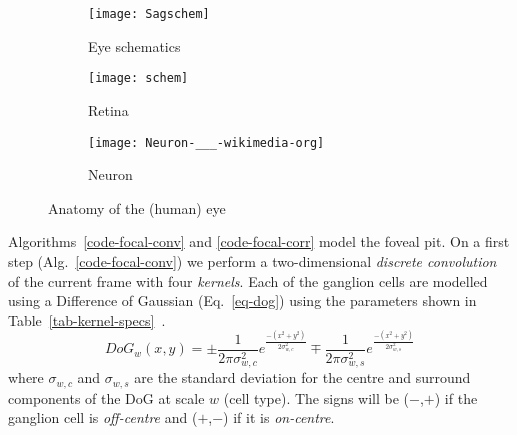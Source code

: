 \begin{figure}[hbt]
  \centering
  \begin{subfigure}[b]{0.15\textwidth}
    \centering
    \texttt{[image: Sagschem]}
    \caption{Eye schematics}
    \label{sub-fig-eye-schematics}
  \end{subfigure}
  \begin{subfigure}[b]{0.15\textwidth}
    \centering
    \texttt{[image: schem]}
    \caption{Retina}
    \label{sub-fig-retinal-layers}
  \end{subfigure}
  \begin{subfigure}[b]{0.15\textwidth}
    \centering
    \texttt{[image: Neuron-\_\_\_-wikimedia-org]}
    \caption{Neuron}
    \label{sub-fig-neuron}
  \end{subfigure}
  
  \caption{Anatomy of the (human) eye \cite{wiki-images}}
  \label{fig-basic-eye-anatomy}
\end{figure}

Algorithms~\ref{code-focal-conv} and \ref{code-focal-corr} model the foveal 
pit. On a first step (Alg.~\ref{code-focal-conv}) we perform a two-dimensional 
\emph{discrete convolution} of the current frame with four \emph{kernels}. 
Each of the ganglion cells are modelled using a Difference of Gaussian 
(Eq.~\ref{eq-dog}) using the parameters shown in 
Table~\ref{tab-kernel-specs}~\cite{field-sensory-coding,basab-model}.
\begin{equation}
\label{eq-dog}
DoG_w(x,y) = \pm\frac{1}{2\pi\sigma_{w,c}^2}e^{\frac{-(x^2 + y^2)}{2\sigma_{w,c}^2}}
\mp\frac{1}{2\pi\sigma_{w,s}^2}e^{\frac{-(x^2 + y^2)}{2\sigma_{w,s}^2}}
\end{equation}
where $\sigma_{w,c}$ and $\sigma_{w,s}$ are the standard deviation for the 
centre and surround components of the DoG at scale $w$ (cell type). The signs 
will be ($-$,$+$) if the ganglion cell is \emph{off-centre} and ($+$,$-$) if it 
is \emph{on-centre}.\\

